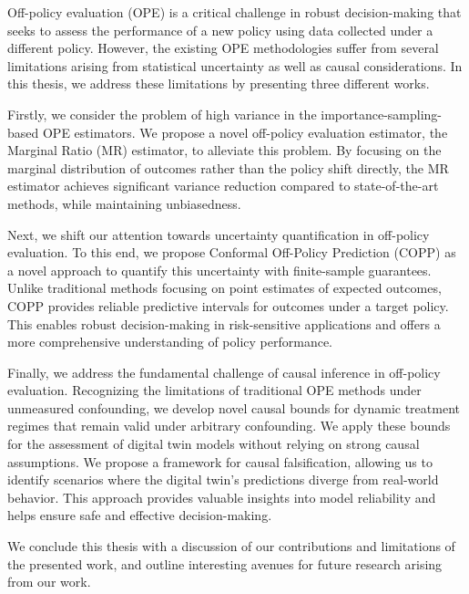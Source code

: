 Off-policy evaluation (OPE) is a critical challenge in robust decision-making that seeks to assess the performance of a new policy using data collected under a different policy. 
However, the existing OPE methodologies suffer from several limitations arising from statistical uncertainty as well as causal considerations. 
In this thesis, we address these limitations by presenting three different works. 

Firstly, we consider the problem of high variance in the importance-sampling-based OPE estimators. 
We propose a novel off-policy evaluation estimator, the Marginal Ratio (MR) estimator, to alleviate this problem.
By focusing on the marginal distribution of outcomes rather than the policy shift directly, the MR estimator achieves significant variance reduction compared to state-of-the-art methods, while maintaining unbiasedness. 

Next, we shift our attention towards uncertainty quantification in off-policy evaluation.
To this end, we propose Conformal Off-Policy Prediction (COPP) as a novel approach to quantify this uncertainty with finite-sample guarantees.
Unlike traditional methods focusing on point estimates of expected outcomes, COPP provides reliable predictive intervals for outcomes under a target policy. This enables robust decision-making in risk-sensitive applications and offers a more comprehensive understanding of policy performance. 

Finally, we address the fundamental challenge of causal inference in off-policy evaluation. 
Recognizing the limitations of traditional OPE methods under unmeasured confounding, we develop novel causal bounds for dynamic treatment regimes that remain valid under arbitrary confounding.
We apply these bounds for the assessment of digital twin models without relying on strong causal assumptions. 
We propose a framework for causal falsification, allowing us to identify scenarios where the digital twin's predictions diverge from real-world behavior. This approach provides valuable insights into model reliability and helps ensure safe and effective decision-making.

We conclude this thesis with a discussion of our contributions and
limitations of the presented work, and outline interesting avenues for future research arising from our work.